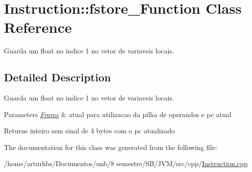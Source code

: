 \hypertarget{classInstruction_1_1fstore__1Function}{}\section{Instruction\+:\+:fstore\+\_\+Function Class Reference}
\label{classInstruction_1_1fstore__1Function}


Guarda um float no indice 1 no vetor de variaveis locais.  




\subsection{Detailed Description}
Guarda um float no indice 1 no vetor de variaveis locais. 


\begin{DoxyParams}{Parameters}
{\em \hyperlink{classFrame}{Frame}} & atual para utilizacao da pilha de operandos e pc atual \\
\hline
\end{DoxyParams}
\begin{DoxyReturn}{Returns}
inteiro sem sinal de 4 bytes com o pc atualizado 
\end{DoxyReturn}


The documentation for this class was generated from the following file\+:\begin{DoxyCompactItemize}
\item 
/home/arturhbs/\+Documentos/unb/8 semestre/\+S\+B/\+J\+V\+M/src/cpp/\hyperlink{Instruction_8cpp}{Instruction.\+cpp}\end{DoxyCompactItemize}
